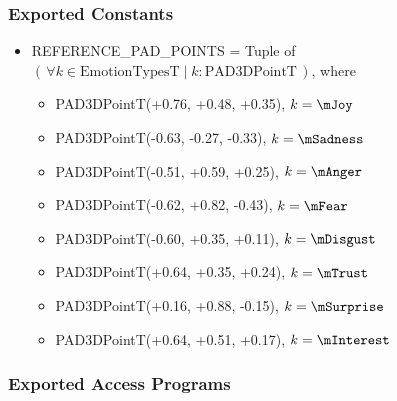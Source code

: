 \subsubsection{Exported Constants}
\begin{itemize}

    \item REFERENCE\_PAD\_POINTS = Tuple of $\left( \, \forall k \in \text{
    EmotionTypesT} \; | \; k : \text{PAD3DPointT} \, \right)$, where

    \begin{itemize}

        \item PAD3DPointT(+0.76, +0.48, +0.35), $k = \mJoy$

        \item PAD3DPointT(-0.63, -0.27, -0.33), $k = \mSadness$

        \item PAD3DPointT(-0.51, +0.59, +0.25), $k = \mAnger$

        \item PAD3DPointT(-0.62, +0.82, -0.43), $k = \mFear$

        \item PAD3DPointT(-0.60, +0.35, +0.11), $k = \mDisgust$

        \item PAD3DPointT(+0.64, +0.35, +0.24), $k = \mTrust$

        \item PAD3DPointT(+0.16, +0.88, -0.15), $k = \mSurprise$

        \item PAD3DPointT(+0.64, +0.51, +0.17), $k = \mInterest$

    \end{itemize}

\end{itemize}

\subsubsection{Exported Access Programs}

